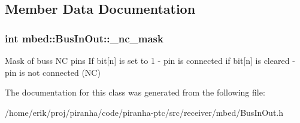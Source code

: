 \subsection{Member Data Documentation}
\subsubsection[{\texorpdfstring{\+\_\+nc\+\_\+mask}{_nc_mask}}]{\setlength{\rightskip}{0pt plus 5cm}int mbed\+::\+Bus\+In\+Out\+::\+\_\+nc\+\_\+mask\hspace{0.3cm}{\ttfamily [protected]}}\hypertarget{classmbed_1_1BusInOut_af4a2854a611341b55a9b62075092a53f}{}\label{classmbed_1_1BusInOut_af4a2854a611341b55a9b62075092a53f}
Mask of bus\textquotesingle{}s NC pins If bit\mbox{[}n\mbox{]} is set to 1 -\/ pin is connected if bit\mbox{[}n\mbox{]} is cleared -\/ pin is not connected (NC) 

The documentation for this class was generated from the following file\+:\begin{DoxyCompactItemize}
\item 
/home/erik/proj/piranha/code/piranha-\/ptc/src/receiver/mbed/Bus\+In\+Out.\+h\end{DoxyCompactItemize}
